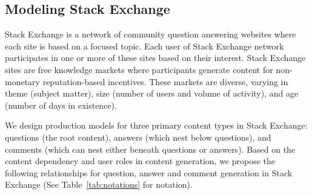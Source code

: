 \subsection{Modeling Stack Exchange}
Stack Exchange is a network of community question answering websites where each site is based on a focused topic. Each user of Stack Exchange network participates in one or more of these sites based on their interest. Stack Exchange sites are free knowledge markets where participants generate content for non-monetary reputation-based incentives. These markets are diverse, varying in theme (subject matter), size (number of users and volume of activity), and age (number of days in existence). 

We design production models for three primary content types in Stack Exchange: questions (the root content), answers (which nest below questions), and comments (which can nest either beneath questions or answers). Based on the content dependency and user roles in content generation, we propose the following relationships for question, answer and comment generation in Stack Exchange (See Table~\ref{tab:notations} for notation).

